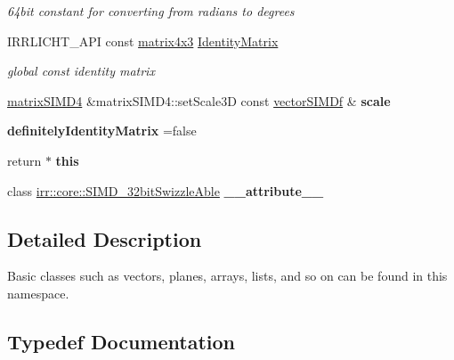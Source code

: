 \begin{DoxyCompactItemize}
\begin{DoxyCompactList}\small\item\em 64bit constant for converting from radians to degrees \end{DoxyCompactList}\item 
I\+R\+R\+L\+I\+C\+H\+T\+\_\+\+A\+PI const \hyperlink{classirr_1_1core_1_1matrix4x3}{matrix4x3} \hyperlink{namespaceirr_1_1core_af9c0ceb45d98dc627c8ed455d223efeb}{Identity\+Matrix}\hypertarget{namespaceirr_1_1core_af9c0ceb45d98dc627c8ed455d223efeb}{}\label{namespaceirr_1_1core_af9c0ceb45d98dc627c8ed455d223efeb}

\begin{DoxyCompactList}\small\item\em global const identity matrix \end{DoxyCompactList}\item 
\hyperlink{classirr_1_1core_1_1matrixSIMD4}{matrix\+S\+I\+M\+D4} \&matrix\+S\+I\+M\+D4\+::set\+Scale3D const \hyperlink{classirr_1_1core_1_1vectorSIMDf}{vector\+S\+I\+M\+Df} \& {\bfseries scale}
\item 
{\bfseries definitely\+Identity\+Matrix} =false\hypertarget{namespaceirr_1_1core_a0f2492919f0fe1997b2b62c60c37cf98}{}\label{namespaceirr_1_1core_a0f2492919f0fe1997b2b62c60c37cf98}

\item 
return $\ast$ {\bfseries this}\hypertarget{namespaceirr_1_1core_a32d1660bebff5a3f4b4a4c30eb164981}{}\label{namespaceirr_1_1core_a32d1660bebff5a3f4b4a4c30eb164981}

\item 
class \hyperlink{classirr_1_1core_1_1SIMD__32bitSwizzleAble}{irr\+::core\+::\+S\+I\+M\+D\+\_\+32bit\+Swizzle\+Able} {\bfseries \+\_\+\+\_\+attribute\+\_\+\+\_\+}\hypertarget{namespaceirr_1_1core_a15a37ecd42a41537d463875ec5d74442}{}\label{namespaceirr_1_1core_a15a37ecd42a41537d463875ec5d74442}

\end{DoxyCompactItemize}


\subsection{Detailed Description}
Basic classes such as vectors, planes, arrays, lists, and so on can be found in this namespace. 

\subsection{Typedef Documentation}
